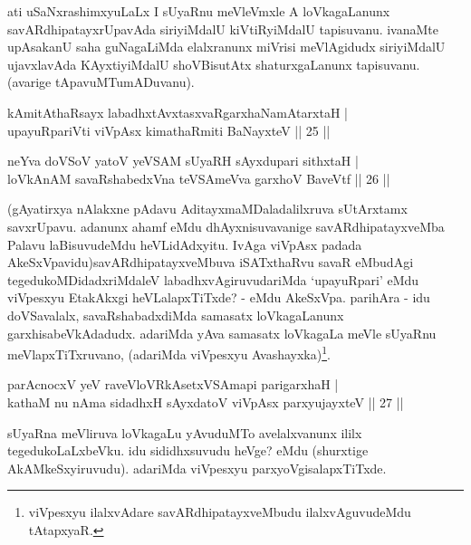\begin{artha} 
ati uSaNxrashimxyuLaLx I sUyaRnu meVleVmxle A loVkagaLanunx 
savARdhipatayxrUpavAda siriyiMdalU kiVtiRyiMdalU tapisuvanu. ivanaMte 
upAsakanU saha guNagaLiMda elalxranunx miVrisi meVlAgidudx siriyiMdalU 
ujavxlavAda KAyxtiyiMdalU shoVBisutAtx shaturxgaLanunx tapisuvanu. 
(avarige tApavuMTumADuvanu).
\end{artha}


\begin{shl}
kAmitAthaRsayx labadhxtAvxtasxvaRgarxhaNamAtarxtaH | \\
upayuRpariVti viVpAsx kimathaRmiti BaNayxteV \hfill ||  25 || 
\end{shl}

\begin{shl}
neYva doVSoV yatoV yeVSAM sUyaRH sAyxdupari sithxtaH | \\
loVkAnAM savaRshabedxVna teVSAmeVva garxhoV BaveVtf \hfill ||  26 || 
\end{shl}

\begin{artha} 
(gAyatirxya nAlakxne pAdavu AditayxmaMDaladalilxruva sUtArxtamx 
savxrUpavu. adanunx ahamf eMdu dhAyxnisuvavanige savARdhipatayxveMba 
Palavu laBisuvudeMdu heVLidAdxyitu. IvAga viVpAsx padada 
AkeSxVpavidu)\ndash  savARdhipatayxveMbuva iSATxthaRvu savaR eMbudAgi 
tegedukoMDidadxriMdaleV labadhxvAgiruvudariMda `upayuRpari' eMdu 
viVpesxyu EtakAkxgi heVLalapxTiTxde? - eMdu AkeSxVpa. parihAra - idu 
doVSavalalx, savaRshabadxdiMda samasatx loVkagaLanunx 
garxhisabeVkAdadudx. adariMda yAva samasatx loVkagaLa meVle sUyaRnu 
meVlapxTiTxruvano, (adariMda viVpesxyu 
Avashayxka)\footnote{viVpesxyu ilalxvAdare savARdhipatayxveMbudu 
ilalxvAguvudeMdu tAtapxyaR.}.
\end{artha}


\begin{shl}
parAcnocxV yeV raveVloVRkAsetxVSAmapi parigarxhaH | \\
kathaM nu nAma sidadhxH sAyxdatoV viVpAsx parxyujayxteV \hfill ||  27 || 
\end{shl}

\begin{artha} 
sUyaRna meVliruva loVkagaLu yAvuduMTo avelalxvanunx ililx 
tegedukoLaLxbeVku. idu sididhxsuvudu heVge? eMdu (shurxtige 
AkAMkeSxyiruvudu). adariMda viVpesxyu parxyoVgisalapxTiTxde.
\end{artha}

